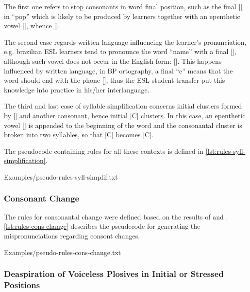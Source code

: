The first one refers to stop consonants in word 
final position, such as the final [] in ``pop'' which is likely to be produced by learners
together with an epenthetic vowel [], whence []. 

The second case regards written language
influencing the learner's pronunciation, e.g. brazilian \ac{ESL} learners tend to pronounce the word ``name'' with a final 
[], although such vowel does not occur in the English form: []. This happens influenced by written language,
in \ac{BP} ortography, a final ``e'' means that the word should end with the phone [], thus the \ac{ESL} student
transfer put this knowledge into practice in his/her interlanguage. 

The third and last case of syllable simplification concerns initial clusters formed
by [] and another consonant, hence initial [C] clusters. In this case, an epenthetic vowel [] is appended to the
beginning of the word and the consonantal cluster is broken into two syllables, so that [C] becomes [C].

The pseudocode containing rules for all these contexts is defined in \autoref{lst:rules-syll-simplification}.

%
    {Examples/pseudo-rules-syll-simplif.txt}

\subsubsection{Consonant Change}\label{sec:consonant-change}
The rules for consonantal change were defined based on the results of
\citeauthor{Reis2006} \citep{Reis2006} and \citeauthor{Trevisol2010} \citep{Trevisol2010}.
\autoref{lst:rules-cons-change} describes the pseudecode for generating the mispronunciations regarding consont changes.

%
    {Examples/pseudo-rules-cons-change.txt}
    
\subsubsection{Deaspiration of Voiceless Plosives in Initial or Stressed Positions}

